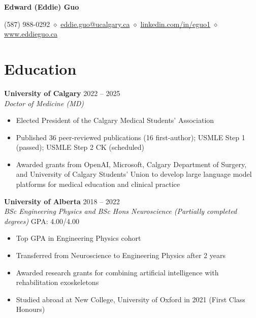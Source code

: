 \documentclass{article}
\begin{document}
\thispagestyle{plain}
\begin{center}
\LARGE \textbf{\textcolor{my_colour}{Edward (Eddie) Guo}} \vspace{.2em}

\normalfont \normalsize
(587) 988-0292 \hspace{.15em}
    \hspace{.15em} $\diamond$ \hspace{.15em}
\href{mailto:eddie.guo@ucalgary.ca}{eddie.guo@ucalgary.ca}
    \hspace{.15em} $\diamond$ \hspace{.15em}
\href{https://www.linkedin.com/in/eguo1}{linkedin.com/in/eguo1}
    \hspace{.15em} $\diamond$ \hspace{.15em}
\href{https://eddieguo.ca}{www.eddieguo.ca}
\end{center}

\vspace{-1.5em}

\section*{\textcolor{my_colour}{Education}}
\vspace{-.25em} \hrulefill \vspace{.25em}

\textbf{University of Calgary} \hfill 2022 -- 2025 \\
\textit{Doctor of Medicine (MD)}
\begin{itemize}
    \item Elected President of the Calgary Medical Students' Association
    \item Published 36 peer-reviewed publications (16 first-author); USMLE Step 1 (passed); USMLE Step 2 CK (scheduled)
    \item Awarded grants from OpenAI, Microsoft, Calgary Department of Surgery, and University of Calgary Students' Union to develop large language model platforms for medical education and clinical practice
\end{itemize} \vspace{1em}

\textbf{University of Alberta} \hfill 2018 -- 2022 \\
\textit{BSc Engineering Physics and BSc Hons Neuroscience (Partially completed degrees)} \hfill GPA: 4.00/4.00
\begin{itemize}
    \item Top GPA in Engineering Physics cohort
    \item Transferred from Neuroscience to Engineering Physics after 2 years
    \item Awarded research grants for combining artificial intelligence with rehabilitation exoskeletons
    \item Studied abroad at New College, University of Oxford in 2021 (First Class Honours)
\end{itemize}
\end{document}
